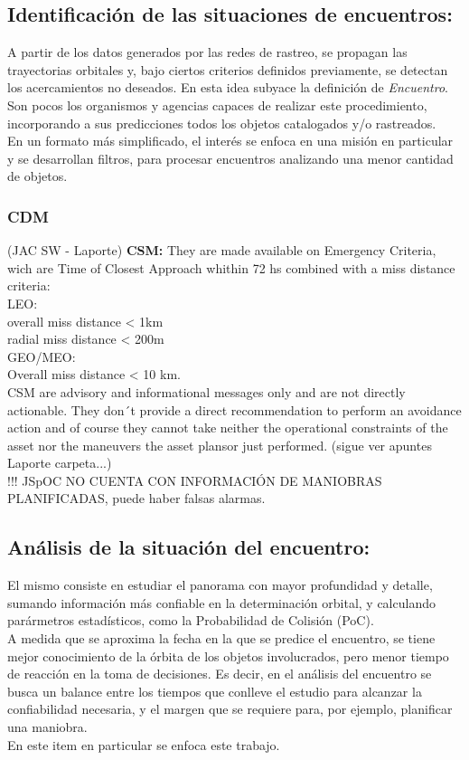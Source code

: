 \subsection*{Identificaci\'on de las situaciones de encuentros:}
A partir de los datos generados por las redes de rastreo, se propagan las trayectorias orbitales y, bajo ciertos criterios definidos previamente, se detectan los acercamientos no deseados. En esta idea subyace la definici\'on de {\it{Encuentro}}.\\
Son pocos los organismos y agencias capaces de realizar este procedimiento, incorporando a sus predicciones todos los objetos catalogados y/o rastreados.\\
En un formato m\'as simplificado, el inter\'es se enfoca en una misi\'on en particular y se desarrollan filtros, para procesar encuentros analizando una menor cantidad de objetos.\\
\subsubsection*{CDM}
(JAC SW - Laporte)
{\bf{CSM:}} They are made available on Emergency Criteria, wich are Time of Closest Approach whithin 72 hs combined with a miss distance criteria:\\
LEO:\\
overall miss distance < 1km\\
radial miss distance < 200m\\
GEO/MEO:\\
Overall miss distance < 10 km.\\

CSM are advisory and informational messages only and are not directly actionable. They don´t provide a direct recommendation to perform an avoidance action and of course they cannot take neither the operational constraints of the asset nor the maneuvers the asset plansor just performed. (sigue ver apuntes Laporte carpeta...)\\

!!! JSpOC NO CUENTA CON INFORMACI\'ON DE MANIOBRAS PLANIFICADAS, puede haber falsas alarmas.\\

\subsection*{An\'alisis de la situaci\'on del encuentro: }
El mismo consiste en estudiar el panorama con mayor profundidad y detalle, sumando informaci\'on m\'as confiable en la determinaci\'on orbital, y calculando par\'armetros estad\'isticos, como la Probabilidad de Colisi\'on (PoC).\\
A medida que se aproxima la fecha en la que se predice el encuentro, se tiene mejor conocimiento de la \'orbita de los objetos involucrados, pero menor tiempo de reacci\'on en la toma de decisiones. Es decir, en el an\'alisis del encuentro se busca un balance entre los tiempos que conlleve el estudio para alcanzar la confiabilidad necesaria, y el margen que se requiere para, por ejemplo, planificar una maniobra.\\
En este item en particular se enfoca este trabajo.\\


